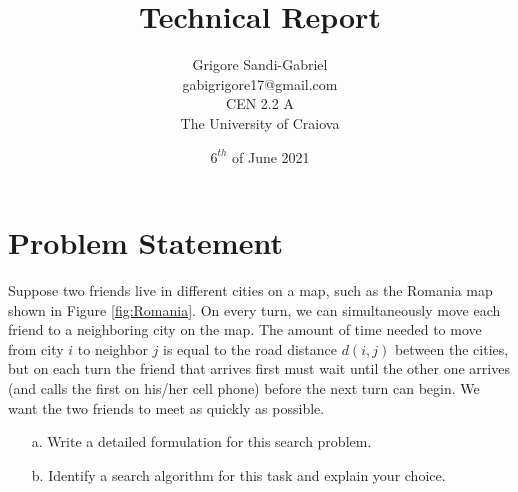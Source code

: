 \documentclass[12pt]{article}
\title{Technical Report}
\author{Grigore Sandi-Gabriel\\
gabigrigore17@gmail.com\\
CEN 2.2 A\\
The University of Craiova\\
}
\date{$6^{th}$ of June 2021}
\begin{document}
\maketitle
\newpage


\section{Problem Statement}\label{sec_ps}

Suppose two friends live in different cities on a map, such as the Romania map shown
in Figure \ref{fig:Romania}. On every turn, we can simultaneously move each friend to a neighboring city on the map. The amount of time needed to move from city $i$ to neighbor $j$ is equal to the road distance $d(i, j)$ between the cities, but on each turn the friend that arrives first must wait until the other one arrives (and calls the first on his/her cell phone) before the next turn can begin. We want the two friends to meet as quickly as possible.
\begin{itemize}
    \item[a.] Write a detailed formulation for this search problem.
    \item[b.] Identify a search algorithm for this task and explain your choice.
\end{itemize}
\end{document}
